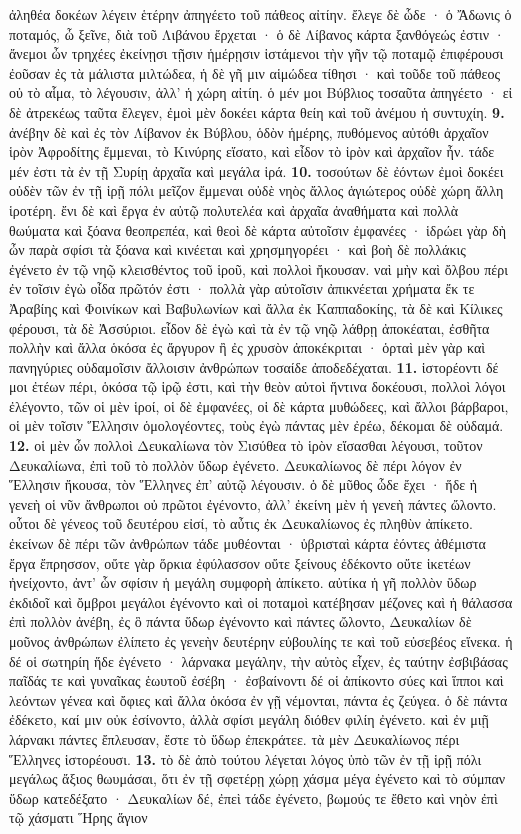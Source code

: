 \documentclass[a4paper, 11pt, oneside, polutonikogreek, german]{article}
\begin{document}
ἀληθέα δοκέων λέγειν ἑτέρην ἀπηγέετο τοῦ πάθεος αἰτίην. ἔλεγε δὲ ὧδε · ὁ Ἄδωνις ὁ ποταμός, ὦ ξεῖνε, διὰ τοῦ Λιβάνου ἔρχεται · ὁ δὲ Λίβανος κάρτα ξανθόγεώς ἐστιν · ἄνεμοι ὦν τρηχέες ἐκείνῃσι τῇσιν ἡμέρῃσιν ἱστάμενοι τὴν γῆν τῷ ποταμῷ ἐπιφέρουσι ἐοῦσαν ἐς τὰ μάλιστα μιλτώδεα, ἡ δὲ γῆ μιν αἱμώδεα τίθησι · καὶ τοῦδε τοῦ πάθεος οὐ τὸ αἷμα, τὸ λέγουσιν, ἀλλ' ἡ χώρη αἰτίη. ὁ μέν μοι Βύβλιος τοσαῦτα ἀπηγέετο · εἰ δὲ ἀτρεκέως ταῦτα ἔλεγεν, ἐμοὶ μὲν δοκέει κάρτα θείη καὶ τοῦ ἀνέμου ἡ συντυχίη. \textbf{9.} ἀνέβην δὲ καὶ ἐς τὸν Λίβανον ἐκ Βύβλου, ὁδὸν ἡμέρης, πυθόμενος αὐτόθι ἀρχαῖον ἱρὸν Ἀφροδίτης ἔμμεναι, τὸ Κινύρης εἵσατο, καὶ εἶδον τὸ ἱρὸν καὶ ἀρχαῖον ἦν. τάδε μέν ἐστι τὰ ἐν τῇ Συρίῃ ἀρχαῖα καὶ μεγάλα ἱρά. \textbf{10.} τοσούτων δὲ ἐόντων ἐμοὶ δοκέει οὐδὲν τῶν ἐν τῇ ἱρῇ πόλι μεῖζον ἔμμεναι οὐδὲ νηὸς ἄλλος ἁγιώτερος οὐδὲ χώρη ἄλλη ἱροτέρη. ἔνι δὲ καὶ ἔργα ἐν αὐτῷ πολυτελέα καὶ ἀρχαῖα ἀναθήματα καὶ πολλὰ θωύματα καὶ ξόανα θεοπρεπέα, καὶ θεοὶ δὲ κάρτα αὐτοῖσιν ἐμφανέες · ἱδρώει γὰρ δὴ ὦν παρὰ σφίσι τὰ ξόανα καὶ κινέεται καὶ χρησμηγορέει · καὶ βοὴ δὲ πολλάκις ἐγένετο ἐν τῷ νηῷ κλεισθέντος τοῦ ἱροῦ, καὶ πολλοὶ ἤκουσαν. ναὶ μὴν καὶ ὄλβου πέρι ἐν τοῖσιν ἐγὼ οἶδα πρῶτόν ἐστι · πολλὰ γὰρ αὐτοῖσιν ἀπικνέεται χρήματα ἔκ τε Ἀραβίης καὶ Φοινίκων καὶ Βαβυλωνίων καὶ ἄλλα ἐκ Καππαδοκίης, τὰ δὲ καὶ Κίλικες φέρουσι, τὰ δὲ Ἀσσύριοι. εἶδον δὲ ἐγὼ καὶ τὰ ἐν τῷ νηῷ λάθρῃ ἀποκέαται, ἐσθῆτα πολλὴν καὶ ἄλλα ὁκόσα ἐς ἄργυρον ἢ ἐς χρυσὸν ἀποκέκριται · ὁρταὶ μὲν γὰρ καὶ πανηγύριες οὐδαμοῖσιν ἄλλοισιν ἀνθρώπων τοσαίδε ἀποδεδέχαται. \textbf{11.} ἱστορέοντι δέ μοι ἐτέων πέρι, ὁκόσα τῷ ἱρῷ ἐστι, καὶ τὴν θεὸν αὐτοὶ ἥντινα δοκέουσι, πολλοὶ λόγοι ἐλέγοντο, τῶν οἱ μὲν ἱροί, οἱ δὲ ἐμφανέες, οἱ δὲ κάρτα μυθώδεες, καὶ ἄλλοι βάρβαροι, οἱ μὲν τοῖσιν Ἕλλησιν ὁμολογέοντες, τοὺς ἐγὼ πάντας μὲν ἐρέω, δέκομαι δὲ οὐδαμά. \textbf{12.} οἱ μὲν ὦν πολλοὶ Δευκαλίωνα τὸν Σισύθεα τὸ ἱρὸν εἵσασθαι λέγουσι, τοῦτον Δευκαλίωνα, ἐπὶ τοῦ τὸ πολλὸν ὕδωρ ἐγένετο. Δευκαλίωνος δὲ πέρι λόγον ἐν Ἕλλησιν ἤκουσα, τὸν Ἕλληνες ἐπ' αὐτῷ λέγουσιν. ὁ δὲ μῦθος ὧδε ἔχει · ἥδε ἡ γενεὴ οἱ νῦν ἄνθρωποι οὐ πρῶτοι ἐγένοντο, ἀλλ' ἐκείνη μὲν ἡ γενεὴ πάντες ὤλοντο. οὗτοι δὲ γένεος τοῦ δευτέρου εἰσί, τὸ αὖτις ἐκ Δευκαλίωνος ἐς πληθὺν ἀπίκετο. ἐκείνων δὲ πέρι τῶν ἀνθρώπων τάδε μυθέονται · ὑβρισταὶ κάρτα ἐόντες ἀθέμιστα ἔργα ἔπρησσον, οὔτε γὰρ ὅρκια ἐφύλασσον οὔτε ξείνους ἐδέκοντο οὔτε ἱκετέων ἠνείχοντο, ἀντ' ὧν σφίσιν ἡ μεγάλη συμφορὴ ἀπίκετο. αὐτίκα ἡ γῆ πολλὸν ὕδωρ ἐκδιδοῖ καὶ ὄμβροι μεγάλοι ἐγένοντο καὶ οἱ ποταμοὶ κατέβησαν μέζονες καὶ ἡ θάλασσα ἐπὶ πολλὸν ἀνέβη, ἐς ὃ πάντα ὕδωρ ἐγένοντο καὶ πάντες ὤλοντο, Δευκαλίων δὲ μοῦνος ἀνθρώπων ἐλίπετο ἐς γενεὴν δευτέρην εὐβουλίης τε καὶ τοῦ εὐσεβέος εἵνεκα. ἡ δέ οἱ σωτηρίη ἥδε ἐγένετο · λάρνακα μεγάλην, τὴν αὐτὸς εἶχεν, ἐς ταύτην ἐσβιβάσας παῖδάς τε καὶ γυναῖκας ἑωυτοῦ ἐσέβη · ἐσβαίνοντι δέ οἱ ἀπίκοντο σύες καὶ ἵπποι καὶ λεόντων γένεα καὶ ὄφιες καὶ ἄλλα ὁκόσα ἐν γῇ νέμονται, πάντα ἐς ζεύγεα. ὁ δὲ πάντα ἐδέκετο, καί μιν οὐκ ἐσίνοντο, ἀλλὰ σφίσι μεγάλη διόθεν φιλίη ἐγένετο. καὶ ἐν μιῇ λάρνακι πάντες ἔπλευσαν, ἔστε τὸ ὕδωρ ἐπεκράτεε. τὰ μὲν Δευκαλίωνος πέρι Ἕλληνες ἱστορέουσι. \textbf{13.} τὸ δὲ ἀπὸ τούτου λέγεται λόγος ὑπὸ τῶν ἐν τῇ ἱρῇ πόλι μεγάλως ἄξιος θωυμάσαι, ὅτι ἐν τῇ σφετέρῃ χώρῃ χάσμα μέγα ἐγένετο καὶ τὸ σύμπαν ὕδωρ κατεδέξατο · Δευκαλίων δέ, ἐπεὶ τάδε ἐγένετο, βωμούς τε ἔθετο καὶ νηὸν ἐπὶ τῷ χάσματι Ἥρης ἅγιον 
\end{document}

